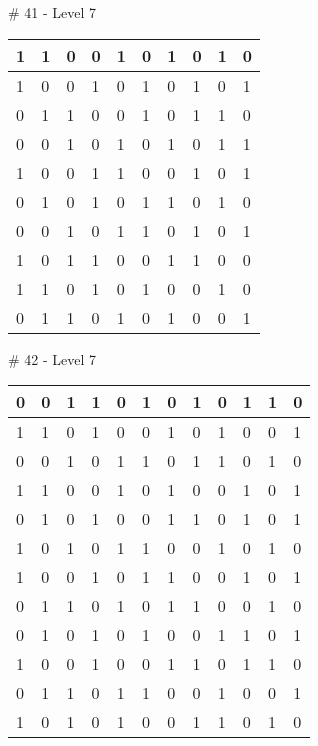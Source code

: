 \# 41 - Level 7 \newline
\begin{tabular}{|m{\collen}|m{\collen}|m{\collen}|m{\collen}|m{\collen}|m{\collen}|m{\collen}|m{\collen}|m{\collen}|m{\collen}|}
\hline
  1 & 1 & 0 & 0 & 1 & 0 & 1 & 0 & 1 & 0 \\
\hline
  1 & 0 & 0 & 1 & 0 & 1 & 0 & 1 & 0 & 1 \\
\hline
  0 & 1 & 1 & 0 & 0 & 1 & 0 & 1 & 1 & 0 \\
\hline
  0 & 0 & 1 & 0 & 1 & 0 & 1 & 0 & 1 & 1 \\
\hline
  1 & 0 & 0 & 1 & 1 & 0 & 0 & 1 & 0 & 1 \\
\hline
  0 & 1 & 0 & 1 & 0 & 1 & 1 & 0 & 1 & 0 \\
\hline
  0 & 0 & 1 & 0 & 1 & 1 & 0 & 1 & 0 & 1 \\
\hline
  1 & 0 & 1 & 1 & 0 & 0 & 1 & 1 & 0 & 0 \\
\hline
  1 & 1 & 0 & 1 & 0 & 1 & 0 & 0 & 1 & 0 \\
\hline
  0 & 1 & 1 & 0 & 1 & 0 & 1 & 0 & 0 & 1 \\
\hline
\end{tabular}


\smallskip

\# 42 - Level 7 \newline
\begin{tabular}{|m{\collen}|m{\collen}|m{\collen}|m{\collen}|m{\collen}|m{\collen}|m{\collen}|m{\collen}|m{\collen}|m{\collen}|m{\collen}|m{\collen}|}
\hline
  0 & 0 & 1 & 1 & 0 & 1 & 0 & 1 & 0 & 1 & 1 & 0 \\
\hline
  1 & 1 & 0 & 1 & 0 & 0 & 1 & 0 & 1 & 0 & 0 & 1 \\
\hline
  0 & 0 & 1 & 0 & 1 & 1 & 0 & 1 & 1 & 0 & 1 & 0 \\
\hline
  1 & 1 & 0 & 0 & 1 & 0 & 1 & 0 & 0 & 1 & 0 & 1 \\
\hline
  0 & 1 & 0 & 1 & 0 & 0 & 1 & 1 & 0 & 1 & 0 & 1 \\
\hline
  1 & 0 & 1 & 0 & 1 & 1 & 0 & 0 & 1 & 0 & 1 & 0 \\
\hline
  1 & 0 & 0 & 1 & 0 & 1 & 1 & 0 & 0 & 1 & 0 & 1 \\
\hline
  0 & 1 & 1 & 0 & 1 & 0 & 1 & 1 & 0 & 0 & 1 & 0 \\
\hline
  0 & 1 & 0 & 1 & 0 & 1 & 0 & 0 & 1 & 1 & 0 & 1 \\
\hline
  1 & 0 & 0 & 1 & 0 & 0 & 1 & 1 & 0 & 1 & 1 & 0 \\
\hline
  0 & 1 & 1 & 0 & 1 & 1 & 0 & 0 & 1 & 0 & 0 & 1 \\
\hline
  1 & 0 & 1 & 0 & 1 & 0 & 0 & 1 & 1 & 0 & 1 & 0 \\
\hline
\end{tabular}



